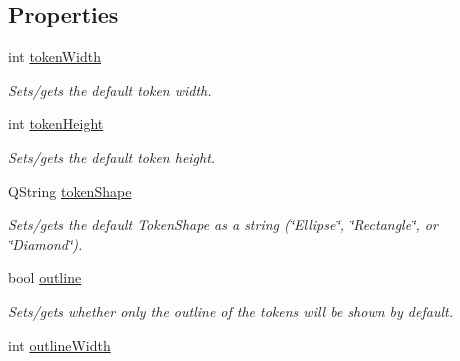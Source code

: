 \subsection*{Properties}
\begin{DoxyCompactItemize}
\item 
\hypertarget{class_picto_1_1_token_factory_graphic_adf2764a52d9aee1a1881ecc9b4e072f9}{int \hyperlink{class_picto_1_1_token_factory_graphic_adf2764a52d9aee1a1881ecc9b4e072f9}{token\-Width}}\label{class_picto_1_1_token_factory_graphic_adf2764a52d9aee1a1881ecc9b4e072f9}

\begin{DoxyCompactList}\small\item\em Sets/gets the default token width. \end{DoxyCompactList}\item 
\hypertarget{class_picto_1_1_token_factory_graphic_a4bff6ec93e08bcdfc39f55fbe925add9}{int \hyperlink{class_picto_1_1_token_factory_graphic_a4bff6ec93e08bcdfc39f55fbe925add9}{token\-Height}}\label{class_picto_1_1_token_factory_graphic_a4bff6ec93e08bcdfc39f55fbe925add9}

\begin{DoxyCompactList}\small\item\em Sets/gets the default token height. \end{DoxyCompactList}\item 
\hypertarget{class_picto_1_1_token_factory_graphic_a05a3d3579ba6078f38e7994a0dde4a9e}{Q\-String \hyperlink{class_picto_1_1_token_factory_graphic_a05a3d3579ba6078f38e7994a0dde4a9e}{token\-Shape}}\label{class_picto_1_1_token_factory_graphic_a05a3d3579ba6078f38e7994a0dde4a9e}

\begin{DoxyCompactList}\small\item\em Sets/gets the default Token\-Shape as a string (\char`\"{}\-Ellipse\char`\"{}, \char`\"{}\-Rectangle\char`\"{}, or \char`\"{}\-Diamond\char`\"{}). \end{DoxyCompactList}\item 
\hypertarget{class_picto_1_1_token_factory_graphic_a64ad46a2b0e873787de822487ebb5f86}{bool \hyperlink{class_picto_1_1_token_factory_graphic_a64ad46a2b0e873787de822487ebb5f86}{outline}}\label{class_picto_1_1_token_factory_graphic_a64ad46a2b0e873787de822487ebb5f86}

\begin{DoxyCompactList}\small\item\em Sets/gets whether only the outline of the tokens will be shown by default. \end{DoxyCompactList}\item 
\hypertarget{class_picto_1_1_token_factory_graphic_ae66f80eb0576e9bb81c585289abee478}{int \hyperlink{class_picto_1_1_token_factory_graphic_ae66f80eb0576e9bb81c585289abee478}{outline\-Width}}\label{class_picto_1_1_token_factory_graphic_ae66f80eb0576e9bb81c585289abee478}


\end{DoxyCompactItemize}

